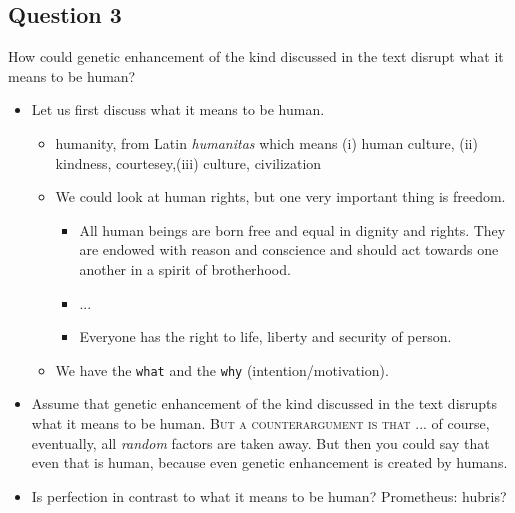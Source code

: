 \documentclass[../main/main.tex]{subfiles}
\begin{document}
\subsection{Question 3} How could genetic enhancement of the kind discussed in the text disrupt what it means to be human?
\begin{itemize}

\item Let us first discuss what it means to be human. 
\begin{itemize}
\item humanity, from Latin \textit{humanitas} which means (i) human culture, (ii) kindness, courtesey,(iii) culture, civilization
\item We could look at human rights, but one very important thing is freedom.
\begin{itemize}
\item All human beings are born free and equal in dignity and rights. They are endowed with reason and conscience and should act towards one another in a spirit of brotherhood.
\item  ...
\item Everyone has the right to life, liberty and security of person.
\end{itemize}
\item We have the \texttt{what} and the \texttt{why} (intention/motivation). 
\end{itemize}

\item Assume that genetic enhancement of the kind discussed in the text disrupts what it means to be human. \textsc{But a counterargument is that} ... of course, eventually, all \textit{random} factors are taken away. But then you could say that even that is human, because even genetic enhancement is created by humans.

\item Is perfection in contrast to what it means to be human? Prometheus: hubris?


\end{itemize}
\end{document}
